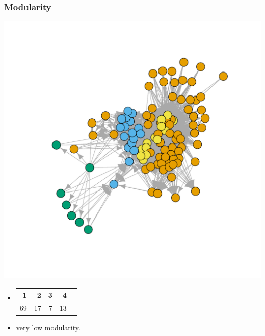 \documentclass[nopagenumber,9pt]{beamer}
\begin{document}
\begin{frame}
 \frametitle{Modularity}
\begin{center}
  \includegraphics[scale=.3]{plots/chilean_modularity.pdf}
 \end{center}
 
 
 
 \begin{itemize}
  \item
  \begin{tabular}{rrrrr}
  \hline
 1 & 2 & 3 & 4 \\ 
  \hline
  69 &  17 &   7 &  13 \\ 
   \hline
\end{tabular}
\item very low modularity.
 \end{itemize}

 
\end{frame}
\end{document}
